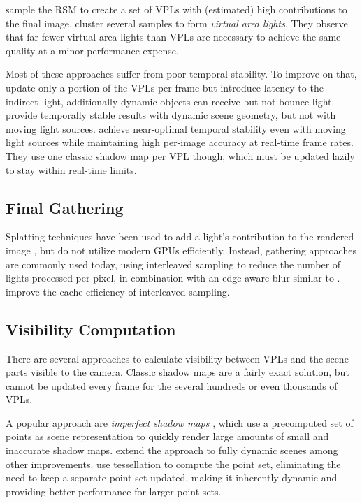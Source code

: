 \citet{georgiev2010simple, ritschel2011ismsViewAdaptive} sample the RSM to create a set of VPLs with (estimated) high contributions to the final image. \citet{dong2009real, prutkin2012reflective} cluster several samples to form \emph{virtual area lights}. They observe that far fewer virtual area lights than VPLs are necessary to achieve the same quality at a minor performance expense.

Most of these approaches suffer from poor temporal stability. To improve on that, \citet{laine2007incremental} update only a portion of the VPLs per frame but introduce latency to the indirect light, additionally dynamic objects can receive but not bounce light. \citet{barak2013temporally} provide temporally stable results with dynamic scene geometry, but not with moving light sources. \citet{hedman2016sequential} achieve near-optimal temporal stability even with moving light sources while maintaining high per-image accuracy at real-time frame rates. They use one classic shadow map per VPL though, which must be updated lazily to stay within real-time limits.


\subsection{Final Gathering}
\label{sec:intro:relatedWorkManyLight:finalGathering}

Splatting techniques have been used to add a light's contribution to the rendered image \citep{dachsbacher2006splatting, Nichols:2009:splatting}, but do not utilize modern GPUs efficiently. Instead, gathering approaches are commonly used today, using interleaved sampling \citep{Keller:2001:InterleavedSampling} to reduce the number of lights processed per pixel, in combination with an edge-aware blur similar to \citet{laine2007incremental}. \citet{segovia2006non} improve the cache efficiency of interleaved sampling.


\subsection{Visibility Computation}
\label{sec:intro:relatedWorkManyLight:visibility}

There are several approaches to calculate visibility between VPLs and the scene parts visible to the camera. Classic shadow maps are a fairly exact solution, but cannot be updated every frame for the several hundreds or even thousands of VPLs.

A popular approach are \emph{imperfect shadow maps} \citep[ISMs,][]{ritschel2008ism}, which use a precomputed set of points as scene representation to quickly render large amounts of small and inaccurate shadow maps. \citet{ritschel2011ismsViewAdaptive} extend the approach to fully dynamic scenes among other improvements. \citet{barak2013temporally} use tessellation to compute the point set, eliminating the need to keep a separate point set updated, making it inherently dynamic and providing better performance for larger point sets.

